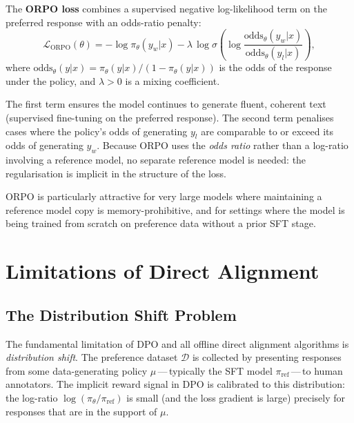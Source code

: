 \begin{definition}
\label{def:orpo-loss}
The \textbf{ORPO loss} combines a supervised negative log-likelihood term on the preferred response with an odds-ratio penalty:
\begin{equation}
\label{eq:orpo-loss}
\mathcal{L}_\mathrm{ORPO}(\theta)
= -\log\pi_\theta(y_w|x)
- \lambda\,\log\sigma\!\left(\log\frac{\mathrm{odds}_\theta(y_w|x)}{\mathrm{odds}_\theta(y_l|x)}\right),
\end{equation}
where $\mathrm{odds}_\theta(y|x) = \pi_\theta(y|x) / (1 - \pi_\theta(y|x))$ is the odds of the response under the policy, and $\lambda > 0$ is a mixing coefficient.
\end{definition}

The first term ensures the model continues to generate fluent, coherent text (supervised fine-tuning on the preferred response). The second term penalises cases where the policy's odds of generating $y_l$ are comparable to or exceed its odds of generating $y_w$. Because ORPO uses the \emph{odds ratio} rather than a log-ratio involving a reference model, no separate reference model is needed: the regularisation is implicit in the structure of the loss.

ORPO is particularly attractive for very large models where maintaining a reference model copy is memory-prohibitive, and for settings where the model is being trained from scratch on preference data without a prior SFT stage.

\section{Limitations of Direct Alignment}
\label{sec:dpo-limitations}

\subsection{The Distribution Shift Problem}

The fundamental limitation of DPO and all offline direct alignment algorithms is \emph{distribution shift}. The preference dataset $\mathcal{D}$ is collected by presenting responses from some data-generating policy $\mu$\,---\,typically the SFT model $\pi_\mathrm{ref}$\,---\,to human annotators. The implicit reward signal in DPO is calibrated to this distribution: the log-ratio $\log(\pi_\theta / \pi_\mathrm{ref})$ is small (and the loss gradient is large) precisely for responses that are in the support of $\mu$.

